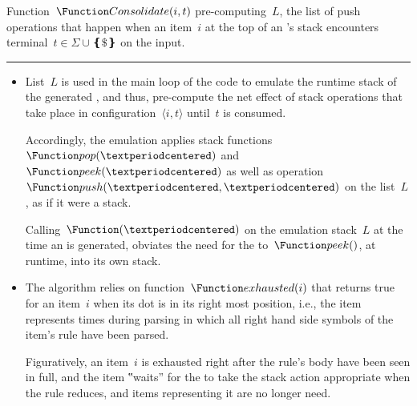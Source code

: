 \begin{algorithm}[htb]
  \caption{\label{algorithm:consolidate}
    Function~$\Function Consolidate(i,t)$ pre-computing~$L$, the list of push
    operations that happen when an item~$i$ at the top of an \RLLp's stack
    encounters terminal~$t∈Σ∪❴\$❵$ on the input.
  }
  \begin{algorithmic}
     
     
       
       
        \ENDWHILE
         
      \FI
       
    \ENDWHILE
     
     
  \end{algorithmic}
  \vspace{0.3ex}
  \hrule
  \vspace{0.3ex}
  \scriptsize
  \begin{itemize}
    \item List~$L$ is used in the main loop of the code to emulate the
          runtime stack of the generated \RLLp, and thus, pre-compute the net effect
          of stack operations that take place in
          configuration~$⟨i,t⟩$ until~$t$ is consumed.
          \par
          Accordingly, the emulation applies stack
          functions~$\Function pop(·)$ and~$\Function peek(·)$
          as well as operation~$\Function push(·,·)$ on the list~$L$,
          as if it were a stack.
          \par
          Calling~$\Function (·)$ on the emulation stack~$L$ at the time an
          \RLLp is generated, obviates the need for the \RLLp to~$\Function
          peek()$, at runtime, into its own stack.
    \item
          The algorithm relies on function~$\Function exhausted(i)$ that returns
          true for an item~$i$ when its dot is in its right most position,
          i.e., the item represents times during parsing in which all
          right hand side symbols of the item's rule have been parsed.
          \par
          Figuratively, an item~$i$ is exhausted right after the rule's body
          have been seen in full, and the item ‟waits” for the \RLLp to take
          the stack action appropriate when the rule reduces, and items representing
          it are no longer need.
  \end{itemize}
\end{algorithm}

